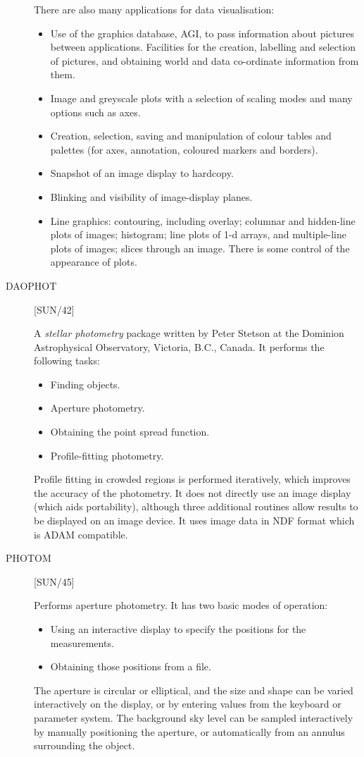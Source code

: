 \begin{description}
There are also many applications for data visualisation:
\begin{itemize}
\item Use of the graphics database, AGI, to pass information about pictures
 between applications.
 Facilities for the creation, labelling and selection of pictures, and
 obtaining world and data co-ordinate information from them.
\item Image and greyscale plots with a selection of scaling modes and many
 options such as axes.
\item Creation, selection, saving and manipulation of colour tables and 
 palettes (for axes, annotation, coloured markers and borders).
\item Snapshot of an image display to hardcopy.
\item Blinking and visibility of image-display planes.
\item Line graphics: contouring, including overlay; columnar and hidden-line
 plots of images; histogram; line plots of 1-d arrays, and multiple-line plots
 of images; slices through an image.
 There is some control of the appearance of plots.
\end{itemize}

\item [DAOPHOT] \hfill [SUN/42]

A {\em stellar photometry} package written by Peter Stetson at the Dominion
Astrophysical Observatory, Victoria, B.C., Canada.
It performs the following tasks:
\begin{itemize}
\item Finding objects.
\item Aperture photometry.
\item Obtaining the point spread function.
\item Profile-fitting photometry.
\end{itemize}
Profile fitting in crowded regions is performed iteratively, which improves the
accuracy of the photometry.
It does not directly use an image display (which aids portability), although
three additional routines allow results to be displayed on an image device.
It uses image data in NDF format which is ADAM compatible.

\item [PHOTOM] \hfill [SUN/45]

Performs aperture photometry.
It has two basic modes of operation:
\begin{itemize}
\item Using an interactive display to specify the positions for the
 measurements.
\item Obtaining those positions from a file.
\end{itemize}
The aperture is circular or elliptical, and the size and shape can be varied
interactively on the display, or by entering values from the keyboard or
parameter system.
The background sky level can be sampled interactively by manually positioning
the aperture, or automatically from an annulus surrounding the object.


\end{description}
